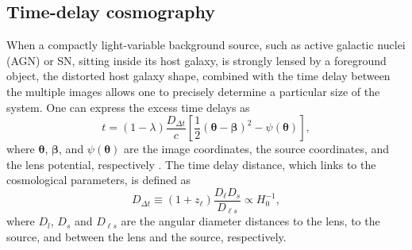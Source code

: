 \documentclass[useAMS,usenatbib]{mnras}
\def\zl{z_{\ell}}
\newcommand{\Ddt}{D_{\Delta t}}
\begin{document}
\subsection{Time-delay cosmography}
\label{sec:TDcosmo} %
When a compactly light-variable background source, such as active galactic nuclei (AGN) or SN, sitting inside its host galaxy, is strongly lensed by a foreground object, the distorted host galaxy shape, combined with the time delay between the multiple images allows one to precisely determine a particular size of the system. One can express the excess time delays as
\begin{equation}
\label{eq:theory}
t=(1-\lambda)\frac{\Ddt}{c}\left[\frac{1}{2}
\left(\boldsymbol{\theta}-\boldsymbol{\beta}\right)^{2}-\psi\left(\boldsymbol{\theta}\right)\right],
\end{equation}
where $\bm{\theta}$, $\bm{\beta}$, and
$\psi\left(\bm{\theta}\right)$ are the image coordinates, the source
coordinates, and the lens potential, respectively \citep{Shapiro64, Refsdal64}.
The time delay distance, which links to the cosmological parameters, %
is defined as
\begin{equation}
\label{eq:TDdistance}
\Ddt\equiv\left(1+
\zl\right)\frac{D_{\ell}D_{s}}{{D_{\ell s}}}\propto H_{0}^{-1},
\end{equation}
where $D_{l}$, $D_{s}$ and $D_{\ell s}$ are the angular diameter distances to the lens, to the source, and between the lens and the source, respectively. 
\end{document}
